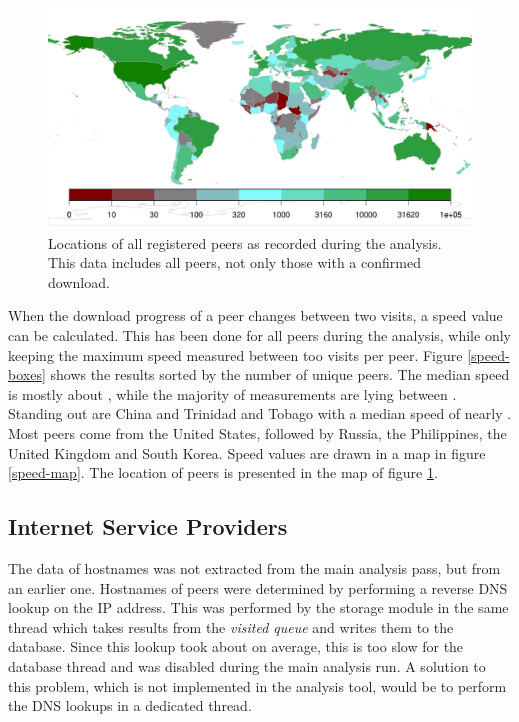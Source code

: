 \documentclass[10pt, a4paper, twoside=false, headsepline]{scrbook}
\renewcommand{\_}{\origunderscore\allowbreak}
\begin{document}
\begin{figure}
\centering
\includegraphics[width=\textwidth]{../result/2015-08-30_20-combined_location_map}
\caption[Location of peers]{Locations of all registered peers as recorded during the analysis. This data includes all peers, not only those with a confirmed download.}
\label{loc-map}
\end{figure}

When the download progress of a peer changes between two visits, a speed value can be calculated. This has been done for all peers during the analysis, while only keeping the maximum speed measured between too visits per peer. Figure \ref{speed-boxes} shows the results sorted by the number of unique peers. The median speed is mostly about , while the majority of measurements are lying between  . Standing out are China and Trinidad and Tobago with a median speed of nearly . Most peers come from the United States, followed by Russia, the Philippines, the United Kingdom and South Korea. Speed values are drawn in a map in figure \ref{speed-map}. The location of peers is presented in the map of figure \ref{loc-map}.

\subsection{Internet Service Providers}
The data of hostnames was not extracted from the main analysis pass, but from an earlier one. Hostnames of peers were determined by performing a reverse DNS lookup on the IP address. This was performed by the storage module in the same thread which takes results from the \emph{visited queue} and writes them to the database. Since this lookup took about  on average, this is too slow for the database thread and was disabled during the main analysis run.
A solution to this problem, which is not implemented in the analysis tool, would be to perform the DNS lookups in a dedicated thread.
\end{document}
